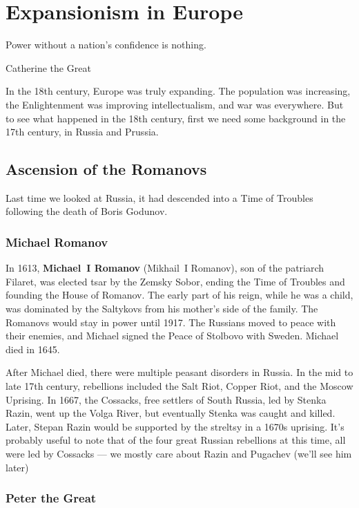 \chapter{Expansionism in Europe}

\epigraph{%
  Power without a nation's confidence is nothing.
}{Catherine the Great}

In the 18th century, Europe was truly expanding.
The population was increasing, the Enlightenment was improving intellectualism, and war was everywhere.
But to see what happened in the 18th century, first we need some background in the 17th century,
in Russia and Prussia.

\section{Ascension of the Romanovs}

Last time we looked at Russia, it had descended into a Time of Troubles following the death of Boris Godunov.

\subsection*{Michael Romanov}

In 1613, \textbf{Michael~I Romanov} (Mikhail~I Romanov), son of the patriarch Filaret,
was elected tsar by the Zemsky Sobor,
ending the Time of Troubles and founding the House of Romanov.
The early part of his reign, while he was a child,
was dominated by the Saltykovs from his mother's side of the family.
The Romanovs would stay in power until 1917.
The Russians moved to peace with their enemies, and Michael signed the Peace of Stolbovo with Sweden.
Michael died in 1645.

After Michael died, there were multiple peasant disorders in Russia.
In the mid to late 17th century, rebellions included the
Salt Riot, Copper Riot, and the Moscow Uprising.
In 1667, the Cossacks, free settlers of South Russia, led by Stenka Razin,
went up the Volga River, but eventually Stenka was caught and killed.
Later, Stepan Razin would be supported by the streltsy in a 1670s uprising.
It's probably useful to note that of the four great Russian rebellions at this time,
all were led by Cossacks --- we mostly care about Razin and Pugachev (we'll see him later)

\subsection*{Peter the Great}


